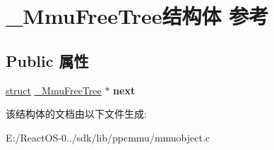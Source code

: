 \hypertarget{struct___mmu_free_tree}{}\section{\+\_\+\+Mmu\+Free\+Tree结构体 参考}
\label{struct___mmu_free_tree}
\subsection*{Public 属性}
\begin{DoxyCompactItemize}
\item 
\mbox{\label{struct___mmu_free_tree_a9cde036f5bb5e496a9816d24907c98ee}} 
\hyperlink{interfacestruct}{struct} \hyperlink{struct___mmu_free_tree}{\+\_\+\+Mmu\+Free\+Tree} $\ast$ {\bfseries next}
\end{DoxyCompactItemize}


该结构体的文档由以下文件生成\+:\begin{DoxyCompactItemize}
\item 
E\+:/\+React\+O\+S-\/0../sdk/lib/ppcmmu/mmuobject.\+c\end{DoxyCompactItemize}
